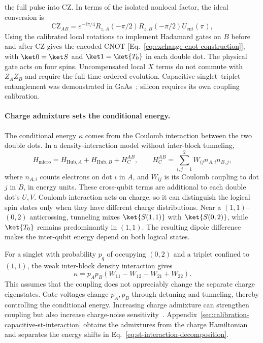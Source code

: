 the full pulse into CZ. In terms of the isolated nonlocal factor,
the ideal conversion is
\begin{equation}
 \mathrm{CZ}_{AB}
   =e^{-i\pi/4}R_{z,A}(-\pi/2)R_{z,B}(-\pi/2)
       U_{\mathrm{ent}}(\pi),
 \label{eq:st-cz-gate}
\end{equation}
Using the calibrated local rotations to implement Hadamard gates
on $B$ before and after CZ gives the encoded CNOT
[Eq.~\eqref{eq:exchange-cnot-construction}], with $\ket0=\ket S$ and
$\ket1=\ket{T_0}$ in each double dot.
The physical gate acts on four spins.
Uncompensated local $X$ terms do not commute with $Z_AZ_B$ and
require the full time-ordered evolution.
Capacitive singlet--triplet entanglement was demonstrated in
GaAs~\cite{Shulman2012}; silicon requires its own coupling calibration.

\paragraph{Charge admixture sets the conditional energy.}
The conditional energy $\kappa$ comes from the Coulomb interaction
between the two double dots. In a density-interaction model without
inter-block tunneling,
\begin{equation}
 H_{\mathrm{micro}}=H_{\mathrm{Hub},A}+H_{\mathrm{Hub},B}
                  +H_C^{AB},
 \qquad
 H_C^{AB}=\sum_{i,j=1}^{2}W_{ij}n_{A,i}n_{B,j},
 \label{eq:st-interblock-coulomb}
\end{equation}
where $n_{A,i}$ counts electrons on dot $i$ in $A$, and $W_{ij}$
is its Coulomb coupling to dot $j$ in $B$, in energy units.
These cross-qubit terms are additional to each double dot's $U,V$.
Coulomb interaction acts on charge, so it can distinguish the logical
spin states only when they have different charge distributions.
Near a $(1,1)$--$(0,2)$ anticrossing, tunneling mixes
$\ket{S(1,1)}$ with $\ket{S(0,2)}$, while $\ket{T_0}$ remains
predominantly in $(1,1)$. The resulting dipole difference makes the
inter-qubit energy depend on both logical states.

For a singlet with probability $p_q$ of occupying $(0,2)$ and a
triplet confined to $(1,1)$, the weak inter-block density interaction
gives
\begin{equation}
 \kappa=p_Ap_B(W_{11}-W_{12}-W_{21}+W_{22}).
 \label{eq:platform-st-charge-coupling}
\end{equation}
This assumes that the coupling does not appreciably change the
separate charge eigenstates. Gate voltages change $p_A,p_B$ through
detuning and tunneling, thereby controlling the conditional energy.
Increasing charge admixture can strengthen coupling but also
increase charge-noise sensitivity~\cite{Burkard2023,Shulman2012}.
Appendix~\ref{sec:calibration-capacitive-st-interaction} obtains the
admixtures from the charge Hamiltonian and separates the energy
shifts in Eq.~\eqref{eq:st-interaction-decomposition}.

